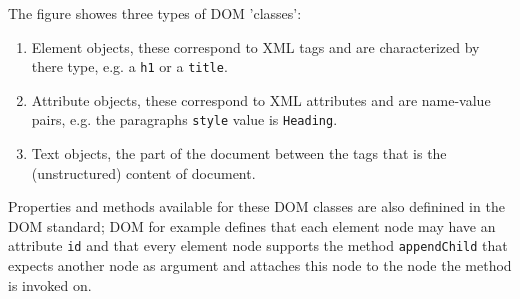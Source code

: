 The figure showes three types of DOM 'classes': 

\begin{enumerate}
	\item Element objects, these correspond to XML tags and are characterized by there type, e.g. a \texttt{h1} or a \texttt{title}.
	\item Attribute objects, these correspond to XML attributes and are name-value pairs, e.g. the paragraphs \texttt{style} value is \texttt{Heading}.
	\item Text objects, the part of the document between the tags that is the (unstructured) content of document.
	
\end{enumerate}

Properties and methods available for these DOM classes are also definined in the DOM standard; DOM for example defines that each element node may have an attribute \texttt{id} and that every element node supports the method \texttt{appendChild} that expects another node as argument and attaches this node to the node the method is invoked on.

